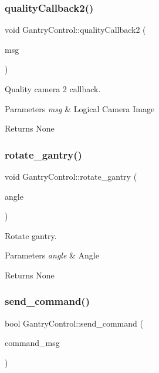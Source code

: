\subsubsection{\texorpdfstring{quality\+Callback2()}{qualityCallback2()}}
{\footnotesize\ttfamily void Gantry\+Control\+::quality\+Callback2 (\begin{DoxyParamCaption}\item[{const nist\+\_\+gear\+::\+Logical\+Camera\+Image \&}]{msg }\end{DoxyParamCaption})}



Quality camera 2 callback. 


\begin{DoxyParams}{Parameters}
{\em msg} & Logical Camera Image \\
\hline
\end{DoxyParams}
\begin{DoxyReturn}{Returns}
None 
\end{DoxyReturn}
\mbox{\label{classGantryControl_ad7a304b37a95f29634631d4183276be3}} 
\subsubsection{\texorpdfstring{rotate\+\_\+gantry()}{rotate\_gantry()}}
{\footnotesize\ttfamily void Gantry\+Control\+::rotate\+\_\+gantry (\begin{DoxyParamCaption}\item[{double}]{angle }\end{DoxyParamCaption})}



Rotate gantry. 


\begin{DoxyParams}{Parameters}
{\em angle} & Angle \\
\hline
\end{DoxyParams}
\begin{DoxyReturn}{Returns}
None 
\end{DoxyReturn}
\mbox{\label{classGantryControl_ab271ce06b0d336eddb26e1ba5a2ce594}} 
\subsubsection{\texorpdfstring{send\+\_\+command()}{send\_command()}}
{\footnotesize\ttfamily bool Gantry\+Control\+::send\+\_\+command (\begin{DoxyParamCaption}\item[{trajectory\+\_\+msgs\+::\+Joint\+Trajectory}]{command\+\_\+msg }\end{DoxyParamCaption})}



